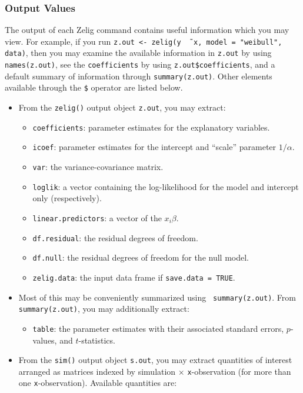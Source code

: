 \subsubsection{Output Values}

The output of each Zelig command contains useful information which you
may view.  For example, if you run \texttt{z.out <- zelig(y \~\,
  x, model = "weibull", data)}, then you may examine the available
information in \texttt{z.out} by using \texttt{names(z.out)},
see the {\tt coefficients} by using {\tt z.out\$coefficients}, and
a default summary of information through \texttt{summary(z.out)}.
Other elements available through the {\tt \$} operator are listed
below.

\begin{itemize}
\item From the {\tt zelig()} output object {\tt z.out}, you may extract:
   \begin{itemize}
   \item {\tt coefficients}: parameter estimates for the explanatory
     variables.
   \item {\tt icoef}: parameter estimates for the intercept and ``scale''
     parameter $1 / \alpha$.  
   \item {\tt var}: the variance-covariance matrix.  
   \item {\tt loglik}: a vector containing the log-likelihood for the
     model and intercept only (respectively).
   \item {\tt linear.predictors}: a vector of the
     $x_{i}\beta$.
   \item {\tt df.residual}: the residual degrees of freedom.
   \item {\tt df.null}: the residual degrees of freedom for the null
     model.
   \item {\tt zelig.data}: the input data frame if {\tt save.data = TRUE}.  
   \end{itemize}
\item Most of this may be conveniently summarized using {\tt
   summary(z.out)}.  From {\tt summary(z.out)}, you may
 additionally extract: 
   \begin{itemize}
   \item {\tt table}: the parameter estimates with their
     associated standard errors, $p$-values, and $t$-statistics.
   \end{itemize}

\item From the {\tt sim()} output object {\tt s.out}, you may extract
  quantities of interest arranged as matrices indexed by simulation
  $\times$ {\tt x}-observation (for more than one {\tt x}-observation).
  Available quantities are:


\end{itemize}
